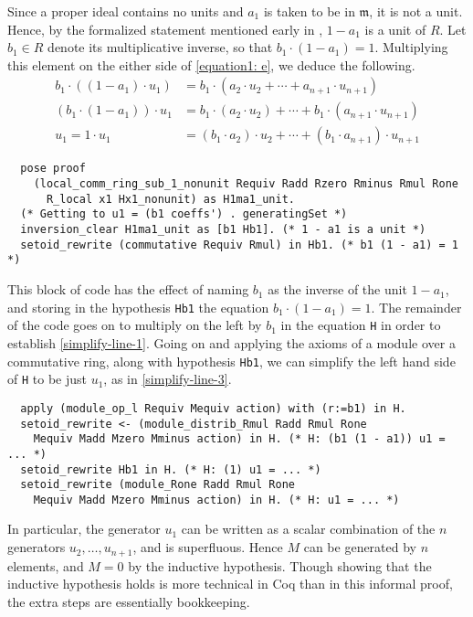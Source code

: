 \documentclass{article}
\begin{document}
Since a proper ideal contains no units and $a_1$ is taken to be in
$\mathfrak{m}$, it is not a unit. Hence, by the formalized statement mentioned
early in , $1 - a_{1}$ is a unit of $R$. Let $b_{1} \in R$ denote its 
multiplicative inverse, so that $b_1 \cdot  (1 - a_{1}) = 1$. Multiplying this
element on the either side of \eqref{equation1: e}, we deduce the following.  
\begin{align}
\label{simplify-line-1}
b_1 \cdot \left((1 - a_{1}) \cdot u_{1} \right)
  & = b_1 \cdot (a_{2} \cdot u_{2} + \cdots + a_{n+1} \cdot u_{n+1}) \\ 
\label{simplify-line-2}
\left( b_1 \cdot (1 - a_{1})\right) \cdot u_{1}
  & = b_1 \cdot (a_{2} \cdot u_{2}) + \cdots + b_1 \cdot (a_{n+1} \cdot u_{n+1}) \\ 
   \label{simplify-line-3}
u_1 = 1 \cdot u_{1}
  & = (b_1 \cdot  a_{2}) \cdot u_{2} + \cdots + (b_1  \cdot  a_{n+1}) \cdot u_{n+1} 
\end{align}
\begin{verbatim}
  pose proof
    (local_comm_ring_sub_1_nonunit Requiv Radd Rzero Rminus Rmul Rone
      R_local x1 Hx1_nonunit) as H1ma1_unit.
  (* Getting to u1 = (b1 coeffs') . generatingSet *)
  inversion_clear H1ma1_unit as [b1 Hb1]. (* 1 - a1 is a unit *)
  setoid_rewrite (commutative Requiv Rmul) in Hb1. (* b1 (1 - a1) = 1 *)
\end{verbatim}

This block of code has the effect of naming \(b_{1}\) as the inverse of the
unit \(1 - a_{1}\), and storing in the hypothesis \texttt{Hb1} the equation
\(b_{1} \cdot (1 - a_{1}) = 1\). The remainder of the code goes on to multiply on the
left by \(b_{1}\) in the equation \texttt{H} in order to establish  \eqref{simplify-line-1}.
Going on and applying the axioms of a module over a commutative ring, along with hypothesis \texttt{Hb1}, we can
simplify the left hand side of \texttt{H} to be just \(u_{1}\), as in \eqref{simplify-line-3}.
\begin{verbatim}
  apply (module_op_l Requiv Mequiv action) with (r:=b1) in H.
  setoid_rewrite <- (module_distrib_Rmul Radd Rmul Rone
    Mequiv Madd Mzero Mminus action) in H. (* H: (b1 (1 - a1)) u1 = ... *)
  setoid_rewrite Hb1 in H. (* H: (1) u1 = ... *)
  setoid_rewrite (module_Rone Radd Rmul Rone
    Mequiv Madd Mzero Mminus action) in H. (* H: u1 = ... *)
\end{verbatim}
In particular, the generator $u_1$ can be written as a scalar combination of
the $n$ generators $u_2, \ldots, u_{n+1}$, and is superfluous. Hence $M$ can be
generated by $n$ elements, and $M=0$ by the inductive hypothesis. 
Though showing that the inductive hypothesis holds is more technical in Coq than in this
informal proof, the extra steps are essentially bookkeeping.
\end{document}
